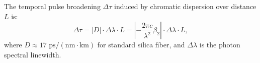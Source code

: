 The temporal pulse broadening $\Delta \tau$ induced by chromatic dispersion over distance $L$ is:
\begin{equation}
    \Delta \tau = |D| \cdot \Delta \lambda \cdot L = \left| -\frac{2\pi c}{\lambda^2} \beta_2 \right| \cdot \Delta \lambda \cdot L,
    \label{eq:chromatic_dispersion_formula}
\end{equation}
where $D \approx 17\text{ ps}/(\text{nm}\cdot\text{km})$ for standard silica fiber, and $\Delta \lambda$ is the photon spectral linewidth.
